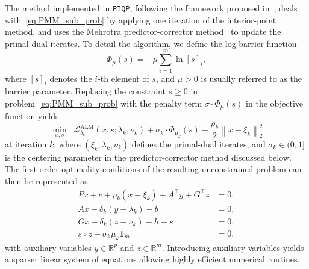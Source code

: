 \documentclass[letterpaper, 10 pt, conference]{ieeeconf}  \IEEEoverridecommandlockouts
\begin{document}
The method implemented in \texttt{PIQP}, following the framework proposed in~\cite{pougkakiotis2021}, deals with~\eqref{eq:PMM_sub_prob} by applying one iteration of the interior-point method, and uses the Mehrotra predictor-corrector
method~\cite{mehrotra1992} to update the primal-dual iterates. To detail the algorithm, we define the log-barrier function 
\begin{equation}
\Phi_\mu(s) = -\mu \sum_{i=1}^m \ln [s]_i,
\end{equation}
where $[s]_i$ denotes the $i$-th element of $s$, and $\mu>0$ is usually referred to as the barrier parameter. Replacing the constraint $s \geq 0$ in problem~\eqref{eq:PMM_sub_prob} with the penalty term $\sigma \cdot \Phi_\mu(s)$ in the objective function yields
\[
\min_{x,s}\;\;\mathcal{L}^\text{ALM}_{\delta_k}(x,s;\lambda_k,\nu_k)+\sigma_k\cdot \Phi_{\mu_k}(s)+ \frac{\rho_k}{2}\left\|x-\xi_k\right\|_2^2 
\]
at iteration $k$, where $(\xi_k,\lambda_k,\nu_k)$ defines the primal-dual iterates, and $\sigma_k\in(0,1]$ is the centering parameter in the predictor-corrector method discussed below. The first-order optimality conditions of the resulting unconstrained problem can then be represented as
\begin{subequations} 
\label{eq:PMM_IP_KKT}
\begin{align}
Px + c + \rho_k(x - \xi_k) + A^\top y + G^\top z & =0, \\
Ax - \delta_k (y-\lambda_k) - b & =0, \\
Gx - \delta_k (z-\nu_k) - h + s & =0, \\
s \circ z - \sigma_k\mu_k \mathbf{1}_m & =0, 
\end{align}
\end{subequations}
with 
auxiliary variables $y\in\mathbb R^p$ and $z\in\mathbb R^m$. Introducing auxiliary variables yields a sparser linear system of equations allowing highly efficient numerical routines. %
\end{document}
